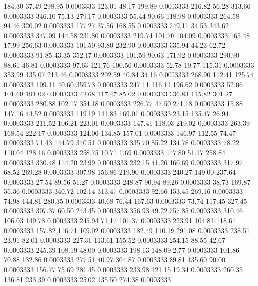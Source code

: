  184.30   37.49  298.95   0.0003333
 123.01   48.17  199.89   0.0003333
 216.82   56.28  313.66   0.0003333
 346.10   75.13  279.17   0.0003333
  55.44   90.66  118.98   0.0003333
 264.58   94.46  320.02   0.0003333
 177.27   37.56  168.55   0.0003333
 349.11   34.53  343.62   0.0003333
 347.09  144.58  231.80   0.0003333
 219.74  101.70  104.09   0.0003333
 165.48   17.99  256.63   0.0003333
 101.50   93.80  232.90   0.0003333
 335.94   44.23   62.72   0.0003333
  91.85   43.35  352.17   0.0003333
 101.59   90.63  171.92   0.0003333
 290.90   88.61   46.81   0.0003333
  97.63  121.76  100.56   0.0003333
  52.78   19.77  115.31   0.0003333
 353.99  135.07  213.46   0.0003333
 202.59   40.84   34.16   0.0003333
 268.90  112.41  125.74   0.0003333
 109.11   40.60  359.73   0.0003333
 247.11  116.11  196.62   0.0003333
  52.06  101.69  191.02   0.0003333
  42.68  117.47   85.02   0.0003333
 336.83  145.82  301.27   0.0003333
 280.88  102.17  354.18   0.0003333
 226.77   47.50  271.18   0.0003333
  15.88  147.16   44.52   0.0003333
 119.19  141.83  169.01   0.0003333
  23.15  135.47   26.94   0.0003333
 211.52  106.21  223.01   0.0003333
 147.41  118.03  219.02   0.0003333
 263.39  168.54  222.17   0.0003333
 124.06  134.85  157.01   0.0003333
 146.97  112.55   74.47   0.0003333
  71.43  144.79  340.51   0.0003333
 335.70   85.22  134.78   0.0003333
  78.22  110.04  128.16   0.0003333
 258.75   10.71    1.69   0.0003333
 147.80   51.17  258.84   0.0003333
 330.48  114.20   23.99   0.0003333
 232.15   41.26  160.69   0.0003333
 317.97   68.52  269.28   0.0003333
 307.98  156.86  219.90   0.0003333
 240.27  149.00  237.64   0.0003333
  27.54   89.56   51.27   0.0003333
 248.87   90.94   89.26   0.0003333
  38.73  169.87   55.36   0.0003333
 340.72  102.14  313.47   0.0003333
  92.66  153.45  269.16   0.0003333
  74.98  144.81  280.35   0.0003333
  40.68   76.44  167.63   0.0003333
  73.74  117.45  327.45   0.0003333
 307.37   60.50  243.45   0.0003333
 356.93   49.22  357.85   0.0003333
 310.46  106.03  149.78   0.0003333
 245.94   71.17  101.37   0.0003333
 223.91  104.81  118.61   0.0003333
 157.82  116.71  109.02   0.0003333
 182.49  110.19  291.08   0.0003333
 238.51   23.91   82.01   0.0003333
 227.31  113.61  155.52   0.0003333
 254.15   88.55   42.67   0.0003333
 245.39  108.19   48.00   0.0003333
 198.13  148.09    2.77   0.0003333
 101.86   70.88  132.86   0.0003333
 277.51   40.97  304.87   0.0003333
  89.81  135.60   90.00   0.0003333
 156.77   75.69  281.45   0.0003333
 233.98  121.15   19.34   0.0003333
 260.35  136.81  233.39   0.0003333
  25.02  135.50  274.38   0.0003333
